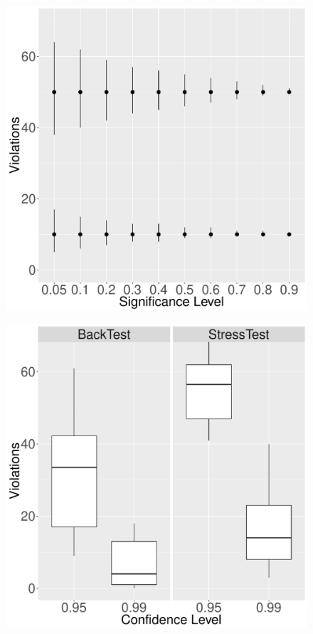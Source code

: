 \documentclass[../Dissertation.tex]{subfiles}
\begin{document}
\begin{figure}[H]
\centering
\begin{minipage}{0.5\textwidth}
  \centering
  \includegraphics[width=\linewidth]{./assets/CoverageIntervals.pdf}
  \label{fig:ConfidenceInterval}
\end{minipage}%
\begin{minipage}{.5\textwidth}
  \centering
  \includegraphics[width=\linewidth]{./assets/ViolationsBoxplots.pdf}
  \label{fig:ViolationsBoxplots}
\end{minipage}
\end{figure}					
\end{document}
